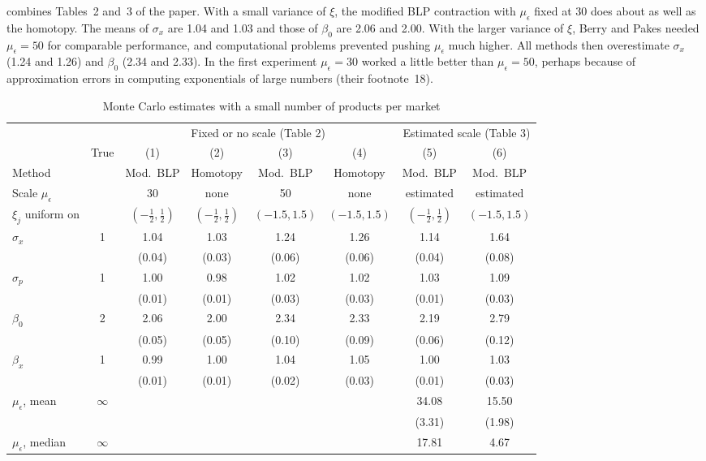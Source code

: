  combines Tables~2 and~3 of the paper. With a small variance of $\xi$, the modified BLP
contraction with $\mu_\epsilon$ fixed at 30 does about as well as the homotopy. The means of $\sigma_x$ are 1.04 and 1.03
and those of $\beta_0$ are 2.06 and 2.00. With the larger variance of $\xi$, Berry and Pakes needed $\mu_\epsilon = 50$ for
comparable performance, and computational problems prevented pushing $\mu_\epsilon$ much higher. All methods then
overestimate $\sigma_x$ (1.24 and 1.26) and $\beta_0$ (2.34 and 2.33). In the first experiment $\mu_\epsilon = 30$ worked a
little better than $\mu_\epsilon = 50$, perhaps because of approximation errors in computing exponentials of large
numbers (their footnote~18).

\begin{table}[htbp]
\centering
\caption{Monte Carlo estimates with a small number of products per market}
\label{tab:06-bp-small}
\small
\setlength{\tabcolsep}{4.5pt}
\begin{tabular}{@{}lccccccc@{}}
\toprule
 & & \multicolumn{4}{c}{Fixed or no scale (Table 2)} & \multicolumn{2}{c}{Estimated scale (Table 3)} \\
\cmidrule(lr){3-6} \cmidrule(l){7-8}
 & True & (1) & (2) & (3) & (4) & (5) & (6) \\
Method & & Mod.\ BLP & Homotopy & Mod.\ BLP & Homotopy & Mod.\ BLP & Mod.\ BLP \\
Scale $\mu_\epsilon$ & & 30 & none & 50 & none & estimated & estimated \\
$\xi_j$ uniform on & & $(-\frac{1}{2}, \frac{1}{2})$ & $(-\frac{1}{2}, \frac{1}{2})$ & $(-1.5, 1.5)$ & $(-1.5, 1.5)$
  & $(-\frac{1}{2}, \frac{1}{2})$ & $(-1.5, 1.5)$ \\
\midrule
$\sigma_x$ & 1 & 1.04 & 1.03 & 1.24 & 1.26 & 1.14 & 1.64 \\
           &   & (0.04) & (0.03) & (0.06) & (0.06) & (0.04) & (0.08) \\
$\sigma_p$ & 1 & 1.00 & 0.98 & 1.02 & 1.02 & 1.03 & 1.09 \\
           &   & (0.01) & (0.01) & (0.03) & (0.03) & (0.01) & (0.03) \\
$\beta_0$  & 2 & 2.06 & 2.00 & 2.34 & 2.33 & 2.19 & 2.79 \\
           &   & (0.05) & (0.05) & (0.10) & (0.09) & (0.06) & (0.12) \\
$\beta_x$  & 1 & 0.99 & 1.00 & 1.04 & 1.05 & 1.00 & 1.03 \\
           &   & (0.01) & (0.01) & (0.02) & (0.03) & (0.01) & (0.03) \\
$\mu_\epsilon$, mean & $\infty$ & & & & & 34.08 & 15.50 \\
                    &          & & & & & (3.31) & (1.98) \\
$\mu_\epsilon$, median & $\infty$ & & & & & 17.81 & 4.67 \\
\bottomrule
\end{tabular}


\end{table}
